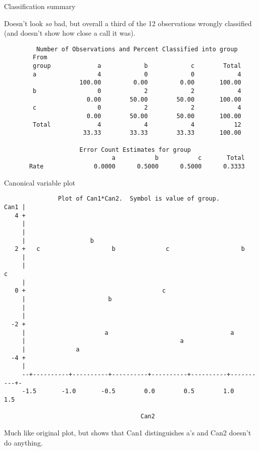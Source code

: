 \documentclass[pdf]{prosper}
\begin{document}
\begin{slide}{Classification summary}

Doesn't look {\em so} bad, but overall a third of the 12 observations wrongly classified (and doesn't show how close a call it was).

{\scriptsize
\begin{verbatim}
         Number of Observations and Percent Classified into group
        From
        group             a            b            c        Total
        a                 4            0            0            4
                     100.00         0.00         0.00       100.00
        b                 0            2            2            4
                       0.00        50.00        50.00       100.00
        c                 0            2            2            4
                       0.00        50.00        50.00       100.00
        Total             4            4            4           12
                      33.33        33.33        33.33       100.00

                     Error Count Estimates for group
                              a           b           c       Total
       Rate              0.0000      0.5000      0.5000      0.3333

\end{verbatim}
}
  
\end{slide}

\begin{slide}{Canonical variable plot}

{\scriptsize
\begin{verbatim}
               Plot of Can1*Can2.  Symbol is value of group.
Can1 |
   4 +
     |
     |
     |                  b
   2 +   c                    b              c                    b
     |
     |                                                                   c
     |
   0 +                                      c
     |                       b
     |
     |
  -2 +
     |                      a                                  a
     |                                           a
     |              a
  -4 +
     |
     --+----------+----------+----------+----------+----------+----------+-
     -1.5       -1.0       -0.5        0.0        0.5        1.0        1.5

                                      Can2

\end{verbatim}
}

Much like original plot, but shows that Can1 distinguishes a's and Can2 doesn't do anything.
  
\end{slide}
\end{document}

